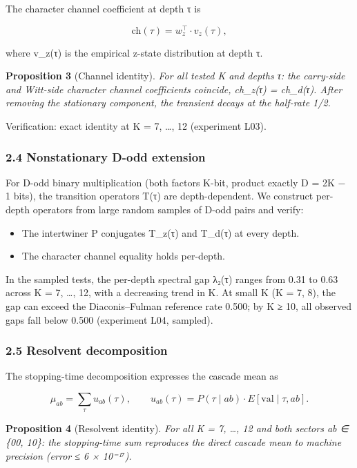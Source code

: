 \documentclass[
  11pt,
]{article}
\providecommand{\tightlist}{%
  \setlength{\itemsep}{0pt}\setlength{\parskip}{0pt}}
\begin{document}
The character channel coefficient at depth τ is

\[\text{ch}(\tau) = w_z^\top \cdot v_z(\tau),\]

where v\_z(τ) is the empirical z-state distribution at depth τ.

\textbf{Proposition 3} (Channel identity). \emph{For all tested K and depths τ:
the carry-side and Witt-side character channel coefficients coincide, ch\_z(τ) =
ch\_d(τ). After removing the stationary component, the transient decays at the
half-rate 1/2.}

Verification: exact identity at K = 7, \ldots, 12 (experiment L03).

\subsubsection{2.4 Nonstationary D-odd
extension}\label{nonstationary-d-odd-extension}

For D-odd binary multiplication (both factors K-bit, product exactly D = 2K − 1
bits), the transition operators T(τ) are depth-dependent. We construct per-depth
operators from large random samples of D-odd pairs and verify:

\begin{itemize}
\tightlist
\item
  The intertwiner P conjugates T\_z(τ) and T\_d(τ) at every depth.
\item
  The character channel equality holds per-depth.
\end{itemize}

In the sampled tests, the per-depth spectral gap \textbar λ₂(τ)\textbar{} ranges
from 0.31 to 0.63 across K = 7, \ldots, 12, with a decreasing trend in K. At
small K (K = 7, 8), the gap can exceed the Diaconis--Fulman reference rate
0.500; by K ≥ 10, all observed gaps fall below 0.500 (experiment L04, sampled).

\subsubsection{2.5 Resolvent decomposition}\label{resolvent-decomposition}

The stopping-time decomposition expresses the cascade mean as

\[\mu_{ab} = \sum_{\tau} u_{ab}(\tau), \qquad u_{ab}(\tau) = P(\tau \mid ab) \cdot E[\text{val} \mid \tau, ab].\]

\textbf{Proposition 4} (Resolvent identity). \emph{For all K = 7, \ldots, 12 and
both sectors ab ∈ \{00, 10\}: the stopping-time sum reproduces the direct
cascade mean to machine precision (error ≤ 6 × 10⁻¹⁷).}
\end{document}
